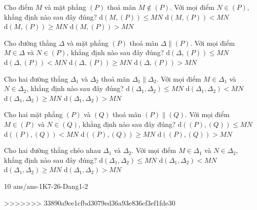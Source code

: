 \begin{ex}%
	Cho điểm $M$ và mặt phẳng $(P)$ thoả mãn $M\not \in (P)$. Với mọi điểm $N \in (P)$, khẳng định nào sau đây đúng?
	\choice
	{\True $\mathrm{d}(M,(P)) \le MN$}
	{$\mathrm{d}(M,(P)) < MN$}
	{$\mathrm{d}(M,(P)) \ge MN$}
	{$\mathrm{d}(M,(P)) > MN$}
\end{ex}
\begin{ex}%
	Cho đường thẳng $\Delta$ và mặt phẳng $(P)$ thoả mãn $\Delta \parallel (P)$. Với mọi điểm $M \in\Delta$ và $N \in (P)$, khẳng định nào sau đây đúng?
	\choice
	{\True $\mathrm{d}(\Delta, (P)) \le MN$}
	{$\mathrm{d}(\Delta, (P)) < MN$}
	{$\mathrm{d}(\Delta, (P)) \ge MN$}
	{$\mathrm{d}(\Delta, (P)) > MN$}
\end{ex}
\begin{ex}%
	Cho hai đường thẳng $\Delta_1$ và $\Delta_2$ thoả mãn $\Delta_1 \parallel \Delta_2$. Với mọi điểm $M \in\Delta_1$ và $N \in \Delta_2$, khẳng định nào sau đây đúng?
	\choice
	{\True $\mathrm{d}(\Delta_1,\Delta_2) \le MN$}
	{$\mathrm{d}(\Delta_1,\Delta_2) < MN$}
	{$\mathrm{d}(\Delta_1,\Delta_2) \ge MN$}
	{$\mathrm{d}(\Delta_1,\Delta_2) > MN$}
\end{ex}
\begin{ex}%
	Cho hai mặt phẳng $(P)$ và $(Q)$ thoả mãn $(P) \parallel (Q)$. Với mọi điểm $M\in (P)$ và $N\in (Q)$, khẳng định nào sau đây đúng?
	\choice
	{\True $\mathrm{d}((P),(Q)) \le MN$}
	{$\mathrm{d}((P),(Q)) < MN$}
	{$\mathrm{d}((P),(Q)) \ge MN$}
	{$\mathrm{d}((P),(Q)) > MN$}
\end{ex}
\begin{ex}%
	Cho hai đường thẳng chéo nhau $\Delta_1$ và $\Delta_2$. Với mọi điểm $M \in\Delta_1$ và $N \in \Delta_2$, khẳng định nào sau đây đúng?
	\choice
	{\True $\mathrm{d}(\Delta_1,\Delta_2) \le MN$}
	{$\mathrm{d}(\Delta_1,\Delta_2) < MN$}
	{$\mathrm{d}(\Delta_1,\Delta_2) \ge MN$}
	{$\mathrm{d}(\Delta_1,\Delta_2) > MN$}
\end{ex}
\begin{indapan}{10}
	{ans/ans-1K7-26-Dang1-2}
\end{indapan}


>>>>>>> 33890a9ce1cfbd3079ed36a93e836cf3ef1fde30
